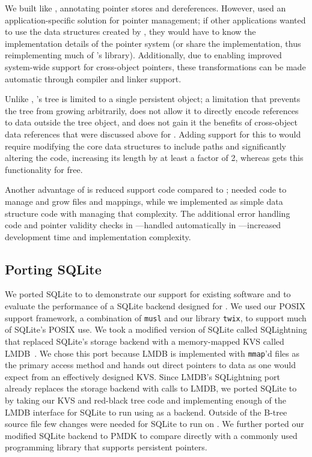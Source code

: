 We built \nvrbt like \unixrbt, annotating pointer stores and
dereferences. However, \unixrbt used an application-specific solution for pointer
management; if other applications wanted to use the data structures created by \unixrbt, they would
have to know the implementation details of the pointer system (or share the implementation, thus
reimplementing much of \Twizzler's library).  Additionally, due to \Twizzler enabling improved
system-wide support for cross-object pointers, these transformations can be made automatic through
compiler and linker support.

Unlike \nvrbt, \unixrbt's tree is limited to a single persistent
object; a limitation that prevents the tree from growing arbitrarily, does not
allow it to directly encode references to data outside the tree object, and does
not gain it the benefits of cross-object data references that were discussed
above for \nvkv. Adding support for this to \unixrbt would require modifying the
core data structures to include paths and significantly altering the code,
increasing its length by at least a factor of 2, whereas \nvrbt gets this
functionality for free.

Another advantage of \nvrbt is reduced support code compared to \unixrbt; \unixrbt needed
code to manage and grow files and mappings, while we implemented \nvrbt as simple data structure code
with \Twizzler managing that complexity. The additional error handling code and pointer
validity checks in \unixrbt---handled automatically in \Twizzler---increased development time
and implementation complexity.


\subsection{Porting SQLite}

We ported SQLite to \Twizzler to demonstrate our support for existing software and to evaluate the
performance of a SQLite backend designed for \Twizzler. We used
our POSIX support framework, a combination of \texttt{musl} and our library
\texttt{twix}, to support much of SQLite's POSIX use.
We took a modified version of SQLite called SQLightning that replaced
SQLite's storage backend with a memory-mapped KVS called LMDB~\cite{lmdb}.
We chose this port
because LMDB is implemented with \texttt{mmap}'d files as the primary access method and hands out
direct pointers to data as one would expect from an effectively designed \NVM KVS.
Since LMDB's SQLightning port already replaces the storage backend
with calls to
LMDB, we ported SQLite to \Twizzler by taking our KVS and red-black tree code and implementing
enough of the LMDB interface for SQLite to run using \Twizzler as a backend.
Outside of the
B-tree source file few changes were needed for
SQLite to run on \Twizzler. We further ported our modified SQLite backend to PMDK to compare
directly with a commonly used \NVM programming library that supports persistent pointers.

